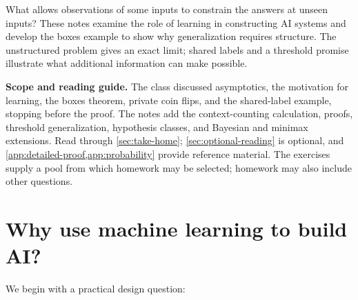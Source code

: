 \documentclass[11pt,twoside]{article}
\theoremstyle{definition}
\theoremstyle{remark}
\begin{document}
\begin{center}
\end{center}

What allows observations of some inputs to constrain the answers at unseen
inputs? These notes examine the role of learning in constructing AI systems
and develop the boxes example to show why generalization requires structure.
The unstructured problem gives an exact limit; shared labels and a threshold
promise illustrate what additional information can make possible.

\noindent\textbf{Scope and reading guide.}
The class discussed asymptotics, the motivation for learning, the boxes
theorem, private coin flips, and the shared-label example, stopping before
the proof. The notes add the context-counting calculation, proofs, threshold
generalization, hypothesis classes, and Bayesian and minimax extensions.
Read through \cref{sec:take-home}; \cref{sec:optional-reading} is optional,
and \cref{app:detailed-proof,app:probability} provide reference material.
The exercises supply a pool from which homework may be selected; homework
may also include other questions.

\section{Why use machine learning to build AI?}
\label{sec:why-learning}

We begin with a practical design question:

\begin{center}
\end{center}
\end{document}
